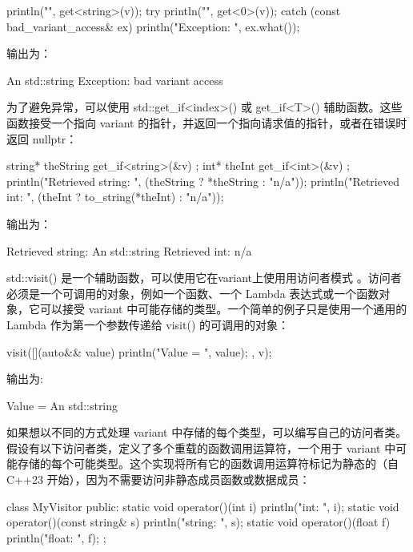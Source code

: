 \begin{cpp}
println("{}", get<string>(v));
try {
    println("{}", get<0>(v));
} catch (const bad_variant_access& ex) {
    println("Exception: {}", ex.what());
}
\end{cpp}

输出为：

\begin{shell}
An std::string
Exception: bad variant access
\end{shell}

为了避免异常，可以使用 std::get\_if<index>() 或 get\_if<T>() 辅助函数。这些函数接受一个指向 variant 的指针，并返回一个指向请求值的指针，或者在错误时返回 nullptr：

\begin{cpp}
string* theString { get_if<string>(&v) };
int* theInt { get_if<int>(&v) };
println("Retrieved string: {}", (theString ? *theString : "n/a"));
println("Retrieved int: {}", (theInt ? to_string(*theInt) : "n/a"));
\end{cpp}

输出为：

\begin{shell}
Retrieved string: An std::string
Retrieved int: n/a
\end{shell}

std::visit() 是一个辅助函数，可以使用它在variant上使用用访问者模式 。访问者必须是一个可调用的对象，例如一个函数、一个 Lambda 表达式或一个函数对象，它可以接受 variant 中可能存储的类型。一个简单的例子只是使用一个通用的 Lambda 作为第一个参数传递给 visit() 的可调用的对象：

\begin{cpp}
visit([](auto&& value) { println("Value = {}", value); }, v);
\end{cpp}

输出为:

\begin{shell}
Value = An std::string
\end{shell}

如果想以不同的方式处理 variant 中存储的每个类型，可以编写自己的访问者类。假设有以下访问者类，定义了多个重载的函数调用运算符，一个用于 variant 中可能存储的每个可能类型。这个实现将所有它的函数调用运算符标记为静态的（自 C++23 开始），因为不需要访问非静态成员函数或数据成员：

\begin{cpp}
class MyVisitor
{
    public:
        static void operator()(int i) { println("int: {}", i); }
        static void operator()(const string& s) { println("string: {}", s); }
        static void operator()(float f) { println("float: {}", f); }
};
\end{cpp}

